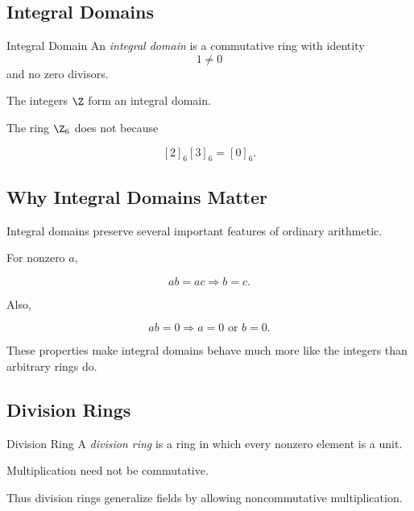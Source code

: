 \subsection{Integral Domains}
\label{subsec:integral-domains}

\begin{definitionbox}{Integral Domain}
An \emph{integral domain} is a commutative ring with identity
\[ 1\neq0 \]
and no zero divisors.
\end{definitionbox}

The integers \(\Z\) form an integral domain.

The ring \(\Z_6\) does not because

\[ [2]_6[3]_6=[0]_6. \]

\subsection{Why Integral Domains Matter}
\label{subsec:why-integral-domains}

Integral domains preserve several important features of ordinary arithmetic.

For nonzero \(a\),

\[ ab=ac\Longrightarrow b=c. \]

Also,

\[ ab=0\Longrightarrow a=0\text{ or }b=0. \]

These properties make integral domains behave much more like the integers
than arbitrary rings do.

\subsection{Division Rings}
\label{subsec:division-rings}

\begin{definitionbox}{Division Ring}
A \emph{division ring} is a ring in which every nonzero element is a unit.
\end{definitionbox}

Multiplication need not be commutative.

Thus division rings generalize fields by allowing noncommutative
multiplication.

